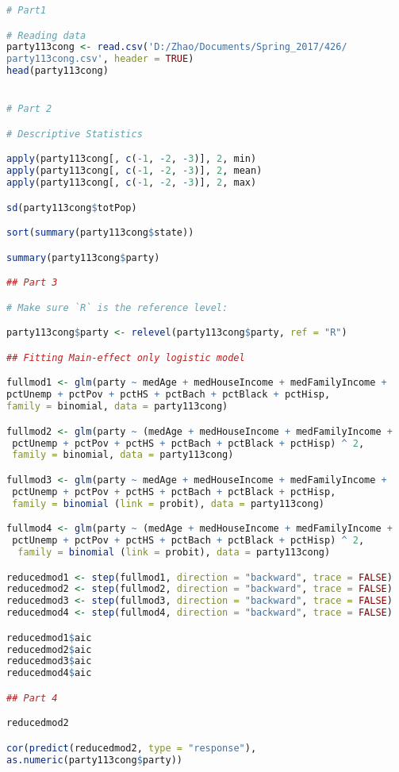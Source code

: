 \documentclass[12pt,a4paper]{article}
\begin{document}
\begin{lstlisting}[language=R]
# Part1

# Reading data
party113cong <- read.csv('D:/Zhao/Documents/Spring_2017/426/
party113cong.csv', header = TRUE)
head(party113cong)


# Part 2

# Descriptive Statistics

apply(party113cong[, c(-1, -2, -3)], 2, min)
apply(party113cong[, c(-1, -2, -3)], 2, mean)
apply(party113cong[, c(-1, -2, -3)], 2, max)

sd(party113cong$totPop)

sort(summary(party113cong$state))

summary(party113cong$party)

## Part 3

# Make sure `R` is the reference level:

party113cong$party <- relevel(party113cong$party, ref = "R")

## Fitting Main-effect only logistic model

fullmod1 <- glm(party ~ medAge + medHouseIncome + medFamilyIncome + 
pctUnemp + pctPov + pctHS + pctBach + pctBlack + pctHisp, 
family = binomial, data = party113cong)

fullmod2 <- glm(party ~ (medAge + medHouseIncome + medFamilyIncome +
 pctUnemp + pctPov + pctHS + pctBach + pctBlack + pctHisp) ^ 2,
 family = binomial, data = party113cong)

fullmod3 <- glm(party ~ medAge + medHouseIncome + medFamilyIncome +
 pctUnemp + pctPov + pctHS + pctBach + pctBlack + pctHisp, 
 family = binomial (link = probit), data = party113cong)

fullmod4 <- glm(party ~ (medAge + medHouseIncome + medFamilyIncome +
 pctUnemp + pctPov + pctHS + pctBach + pctBlack + pctHisp) ^ 2,
  family = binomial (link = probit), data = party113cong)

reducedmod1 <- step(fullmod1, direction = "backward", trace = FALSE)
reducedmod2 <- step(fullmod2, direction = "backward", trace = FALSE)
reducedmod3 <- step(fullmod3, direction = "backward", trace = FALSE)
reducedmod4 <- step(fullmod4, direction = "backward", trace = FALSE)

reducedmod1$aic
reducedmod2$aic
reducedmod3$aic
reducedmod4$aic

## Part 4

reducedmod2

cor(predict(reducedmod2, type = "response"), 
as.numeric(party113cong$party))


\end{lstlisting}
\end{document}
